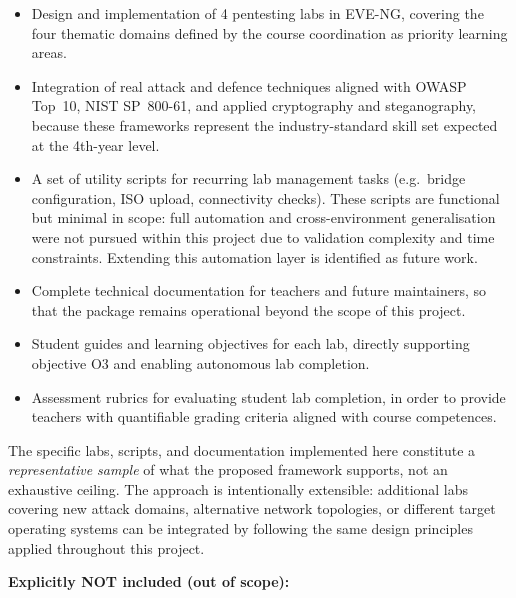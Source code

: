 \begin{itemize}
    \item Design and implementation of 4 pentesting labs in EVE-NG, covering
          the four thematic domains defined by the course coordination as
          priority learning areas.
    \item Integration of real attack and defence techniques aligned with
          OWASP Top~10\cite{owasp2021}, NIST SP~800-61\cite{nist_sp80061},
          and applied cryptography and steganography, because these frameworks
          represent the industry-standard skill set expected at the 4th-year
          level.
    \item A set of utility scripts for recurring lab management tasks
          (e.g.\ bridge configuration, ISO upload, connectivity checks).
          These scripts are functional but minimal in scope: full automation
          and cross-environment generalisation were not pursued within this
          project due to validation complexity and time constraints.
          Extending this automation layer is identified as future work.
    \item Complete technical documentation for teachers and future
          maintainers, so that the package remains operational beyond the
          scope of this project.
    \item Student guides and learning objectives for each lab, directly
          supporting objective O3 and enabling autonomous lab completion.
    \item Assessment rubrics for evaluating student lab completion,
          in order to provide teachers with quantifiable grading criteria
          aligned with course competences.
\end{itemize}

The specific labs, scripts, and documentation implemented here constitute a
\emph{representative sample} of what the proposed framework supports, not an
exhaustive ceiling. The approach is intentionally extensible: additional labs
covering new attack domains, alternative network topologies, or different target
operating systems can be integrated by following the same design principles
applied throughout this project.

\textbf{Explicitly NOT included (out of scope):}


